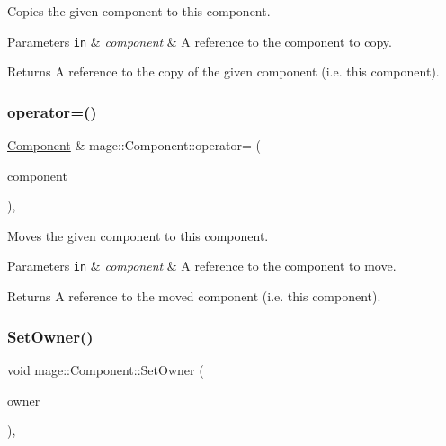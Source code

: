 Copies the given component to this component.


\begin{DoxyParams}[1]{Parameters}
\mbox{\tt in}  & {\em component} & A reference to the component to copy. \\
\hline
\end{DoxyParams}
\begin{DoxyReturn}{Returns}
A reference to the copy of the given component (i.\+e. this component). 
\end{DoxyReturn}
\hypertarget{classmage_1_1_component_ad45dae559785efbc090c0f83c1e08cd1}{}\label{classmage_1_1_component_ad45dae559785efbc090c0f83c1e08cd1} 
\subsubsection{\texorpdfstring{operator=()}{operator=()}\hspace{0.1cm}{\footnotesize\ttfamily [2/2]}}
{\footnotesize\ttfamily \hyperlink{classmage_1_1_component}{Component} \& mage\+::\+Component\+::operator= (\begin{DoxyParamCaption}\item[{\hyperlink{classmage_1_1_component}{Component} \&\&}]{component }\end{DoxyParamCaption})\hspace{0.3cm}{\ttfamily [default]}, {\ttfamily [noexcept]}}

Moves the given component to this component.


\begin{DoxyParams}[1]{Parameters}
\mbox{\tt in}  & {\em component} & A reference to the component to move. \\
\hline
\end{DoxyParams}
\begin{DoxyReturn}{Returns}
A reference to the moved component (i.\+e. this component). 
\end{DoxyReturn}
\hypertarget{classmage_1_1_component_aed5c7f7af79357f708c71572d7d99638}{}\label{classmage_1_1_component_aed5c7f7af79357f708c71572d7d99638} 
\subsubsection{\texorpdfstring{Set\+Owner()}{SetOwner()}}
{\footnotesize\ttfamily void mage\+::\+Component\+::\+Set\+Owner (\begin{DoxyParamCaption}\item[{\hyperlink{classmage_1_1_proxy_ptr}{Proxy\+Ptr}$<$ \hyperlink{classmage_1_1_node}{Node} $>$}]{owner }\end{DoxyParamCaption})\hspace{0.3cm}{\ttfamily [private]}, {\ttfamily [noexcept]}}

